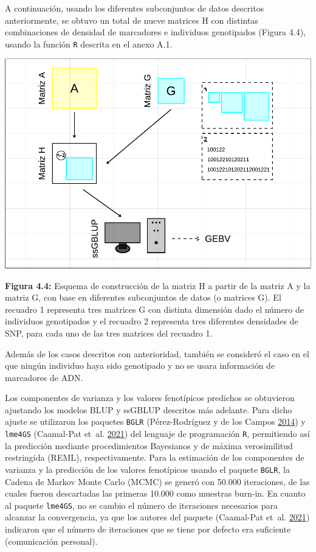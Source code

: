 \documentclass[11pt,spanish,a4paper,oneside,]{book} %
\begin{document}
A continuación, usando los diferentes subconjuntos de datos descritos anteriormente, se obtuvo un total de nueve matrices H con distintas combinaciones de densidad de marcadores e individuos genotipados (Figura 4.4), usando la función \texttt{R} descrita en el anexo A.1.

\begin{center}\includegraphics[width=1\linewidth]{figures/Esquema_1} \end{center}

\noindent
\textbf{Figura 4.4:} Esquema de construcción de la matriz H a partir de la matriz A y la matriz G, con base en diferentes subconjuntos de datos (o matrices G). El recuadro 1 representa tres matrices G con distinta dimensión dado el número de individuos genotipados y el recuadro 2 representa tres diferentes densidades de SNP, para cada uno de las tres matrices del recuadro 1.

Además de los casos descritos con anterioridad, también se consideró el caso en el que ningún individuo haya sido genotipado y no se usara información de marcadores de ADN.

Los componentes de varianza y los valores fenotípicos predichos se obtuvieron ajustando los modelos BLUP y ssGBLUP descritos más adelante. Para dicho ajuste se utilizaron los paquetes \texttt{BGLR} (Pérez-Rodríguez y de los Campos \protect\hyperlink{ref-cite:50}{2014}) y \texttt{lme4GS} (Caamal-Pat et~al. \protect\hyperlink{ref-cite:51}{2021}) del lenguaje de programación \texttt{R}, permitiendo así la predicción mediante procedimientos Bayesianos y de máxima verosimilitud restringida (REML), respectivamente. Para la estimación de los componentes de varianza y la predicción de los valores fenotípicos usando el paquete \texttt{BGLR}, la Cadena de Markov Monte Carlo (MCMC) se generó con 50.000 iteraciones, de las cuales fueron descartadas las primeras 10.000 como muestras burn-in. En cuanto al paquete \texttt{lme4GS}, no se cambio el número de iteraciones necesarios para alcanzar la convergencia, ya que los autores del paquete (Caamal-Pat et~al. \protect\hyperlink{ref-cite:51}{2021}) indicaron que el número de iteraciones que se tiene por defecto era suficiente (comunicación personal).
\end{document}
